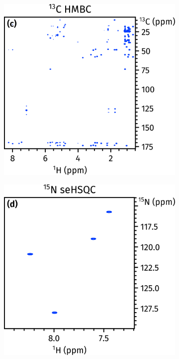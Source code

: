 \documentclass[a4paper,12pt]{article}
\begin{document}
\begin{refsection}
\begin{figure}[htb]
\begin{subfigure}[b]{\textwidth}
    \end{subfigure}
\end{figure}
\begin{figure}[htb]
    \ContinuedFloat
    \begin{subfigure}[b]{\textwidth}
        \centering
        \includegraphics[]{abbss_3.png}%
    \end{subfigure}
\end{figure}
\begin{figure}[htb]
    \ContinuedFloat
    \begin{subfigure}[b]{\textwidth}
        \centering
        \includegraphics[]{abbss_4.png}%
    \end{subfigure}
\end{figure}


\end{refsection}
\end{document}

